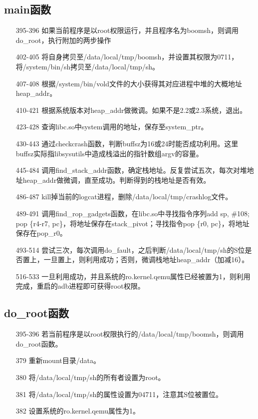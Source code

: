 \subsection{main函数}

\begin{itemize}
\item[395-396] 如果当前程序是以root权限运行，并且程序名为boomsh，则调用do\_root，执行附加的两步操作
\item[402-405] 将自身拷贝至/data/local/tmp/boomsh，并设置其权限为0711，将/system/bin/sh拷贝至/data/local/tmp/sh。
\item[407-408] 根据/system/bin/vold文件的大小获得其对应进程中堆的大概地址heap\_addr。
\item[410-421] 根据系统版本对heap\_addr做微调。如果不是2.2或2.3系统，退出。
\item[423-428] 查询libc.so中system调用的地址，保存至system\_ptr。
\item[430-443] 通过checkcrash函数，判断buffsz为16或24时能否成功利用。这里buffsz实际指libsysutils中造成栈溢出的指针数组argv的容量。
\item[445-484] 调用find\_stack\_addr函数，确定栈地址。反复尝试五次，每次对堆地址heap\_addr做微调，直至成功。判断得到的栈地址是否有效。
\item[486-487] kill掉当前的logcat进程，删除/data/local/tmp/crashlog文件。
\item[489-491] 调用find\_rop\_gadgets函数，在libc.so中寻找指令序列add sp, \#108; pop \{r4-r7, pc\}，将地址保存在stack\_pivot；寻找指令pop \{r0, pc\}，将地址保存在pop\_r0。
\item[493-514] 尝试三次，每次调用do\_fault，之后判断/data/local/tmp/sh的S位是否置上，一旦置上，则利用成功；否则，微调栈地址heap\_addr（加减16）。
\item[516-533] 一旦利用成功，并且系统的ro.kernel.qemu属性已经被置为1，则利用完成，重启的adb进程即可获得root权限。
\end{itemize}

\subsection{do\_root函数}

\begin{itemize}
\item[395-396] 若当前程序是以root权限执行的/data/local/tmp/boomsh，则调用do\_root函数。
\item[379] 重新mount目录/data。
\item[380] 将/data/local/tmp/sh的所有者设置为root。
\item[381] 将/data/local/tmp/sh的属性设置为04711，注意其S位被置位。
\item[382] 设置系统的ro.kernel.qemu属性为1。
\end{itemize}

